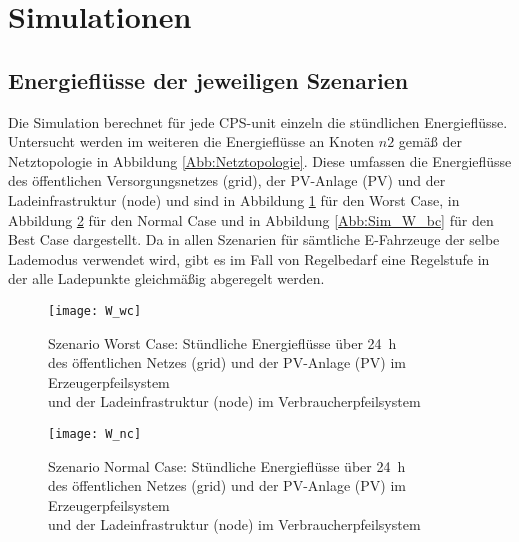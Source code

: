 
\section{Simulationen}
	\label{Kap:Simulation}
	\subsection{Energieflüsse der jeweiligen Szenarien}
		Die Simulation berechnet für jede CPS-unit einzeln die stündlichen Energieflüsse. Untersucht werden im weiteren die Energieflüsse an Knoten $n2$ gemäß der Netztopologie in Abbildung \ref{Abb:Netztopologie}. Diese umfassen die Energieflüsse des öffentlichen Versorgungsnetzes (grid), der PV-Anlage (PV) und der Ladeinfrastruktur (node) und sind in Abbildung \ref{Abb:Sim_W_wc} für den Worst Case, in Abbildung \ref{Abb:Sim_W_nc} für den Normal Case und in Abbildung \ref{Abb:Sim_W_bc} für den Best Case dargestellt. Da in allen Szenarien für sämtliche E-Fahrzeuge der selbe Lademodus verwendet wird, gibt es im Fall von Regelbedarf eine Regelstufe in der alle Ladepunkte gleichmäßig abgeregelt werden. \\
		
        \begin{figure}[h]
			\centering
			\texttt{[image: W\_wc]}
			\caption{Szenario Worst Case: Stündliche Energieflüsse über 24~h \\ 
            	des öffentlichen Netzes (grid) und der PV-Anlage (PV) im Erzeugerpfeilsystem \\
            	und der Ladeinfrastruktur (node) im Verbraucherpfeilsystem}
			\label{Abb:Sim_W_wc}
		\end{figure}

		\begin{figure}[h]
			\centering
			\texttt{[image: W\_nc]}
			\caption{Szenario Normal Case: Stündliche Energieflüsse über 24~h \\ 
            	des öffentlichen Netzes (grid) und der PV-Anlage (PV) im Erzeugerpfeilsystem \\
            	und der Ladeinfrastruktur (node) im Verbraucherpfeilsystem}
			\label{Abb:Sim_W_nc}
		\end{figure}

